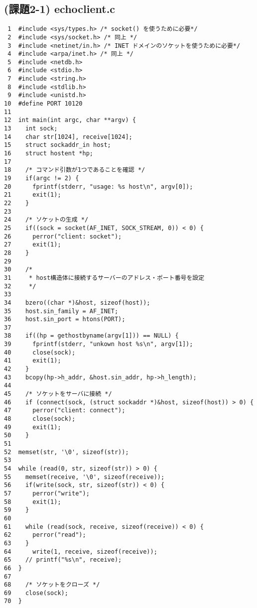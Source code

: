 \documentclass[a4j]{jarticle}
\begin{document}
\subsection{(課題2-1) echoclient.c}
\label{sec:echoclient_code}
\small{
\begin{verbatim}
 1  #include <sys/types.h> /* socket() を使うために必要*/
 2  #include <sys/socket.h> /* 同上 */
 3  #include <netinet/in.h> /* INET ドメインのソケットを使うために必要*/
 4  #include <arpa/inet.h> /* 同上 */
 5  #include <netdb.h>
 6  #include <stdio.h>
 7  #include <string.h>
 8  #include <stdlib.h>
 9  #include <unistd.h>
10  #define PORT 10120
11
12  int main(int argc, char **argv) {
13    int sock;
14    char str[1024], receive[1024];
15    struct sockaddr_in host;
16    struct hostent *hp;
17
18    /* コマンド引数が1つであることを確認 */
19    if(argc != 2) {
20      fprintf(stderr, "usage: %s host\n", argv[0]);
21      exit(1);
22    }
23
24    /* ソケットの生成 */
25    if((sock = socket(AF_INET, SOCK_STREAM, 0)) < 0) {
26      perror("client: socket");
27      exit(1);
28    }
29
30    /*
31     * host構造体に接続するサーバーのアドレス・ポート番号を設定
32     */
33
34    bzero((char *)&host, sizeof(host));
35    host.sin_family = AF_INET;
36    host.sin_port = htons(PORT);
37
38    if((hp = gethostbyname(argv[1])) == NULL) {
39      fprintf(stderr, "unkown host %s\n", argv[1]);
40      close(sock);
41      exit(1);
42    }
43    bcopy(hp->h_addr, &host.sin_addr, hp->h_length);
44
45    /* ソケットをサーバに接続 */
46    if (connect(sock, (struct sockaddr *)&host, sizeof(host)) > 0) {
47      perror("client: connect");
48      close(sock);
49      exit(1);
50    }
51
52  memset(str, '\0', sizeof(str));
53
54  while (read(0, str, sizeof(str)) > 0) {
55    memset(receive, '\0', sizeof(receive));
56    if(write(sock, str, sizeof(str)) < 0) {
57      perror("write");
58      exit(1);
59    }
60
61    while (read(sock, receive, sizeof(receive)) < 0) {
62      perror("read");
63    }
64      write(1, receive, sizeof(receive));
65    // printf("%s\n", receive);
66  }
67
68    /* ソケットをクローズ */
69    close(sock);
70  }
\end{verbatim}
}
\end{document}
